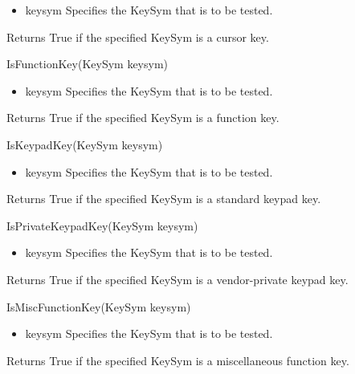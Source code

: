 \documentclass{report}
\begin{document}
\begin{itemize}
\begin{itemize}
\begin{itemize}
                \item keysym Specifies the KeySym that is to be tested.
            \end{itemize}
            Returns True if the specified KeySym is a cursor key.
            \bigbreak \noindent 
            \begin{cppcode}
                IsFunctionKey(KeySym keysym)
            \end{cppcode}
            \bigbreak \noindent
            \begin{itemize}
                \item keysym Specifies the KeySym that is to be tested.
            \end{itemize}
            Returns True if the specified KeySym is a function key.
            \bigbreak \noindent 
            \begin{cppcode}
                IsKeypadKey(KeySym keysym)
            \end{cppcode}
            \bigbreak \noindent
            \begin{itemize}
                \item keysym Specifies the KeySym that is to be tested.
            \end{itemize}
            Returns True if the specified KeySym is a standard keypad key.
            \bigbreak \noindent 
            \begin{cppcode}
                IsPrivateKeypadKey(KeySym keysym)
            \end{cppcode}
            \bigbreak \noindent
            \begin{itemize}
                \item keysym Specifies the KeySym that is to be tested.
            \end{itemize}
            Returns True if the specified KeySym is a vendor-private keypad key.
            \bigbreak \noindent 
            \begin{cppcode}
                IsMiscFunctionKey(KeySym keysym)
            \end{cppcode}
            \bigbreak \noindent
            \begin{itemize}
                \item keysym Specifies the KeySym that is to be tested.
            \end{itemize}
            Returns True if the specified KeySym is a miscellaneous function key.
            \bigbreak \noindent 
            \begin{cppcode}

\end{cppcode}
\end{itemize}
\end{itemize}
\end{document}
